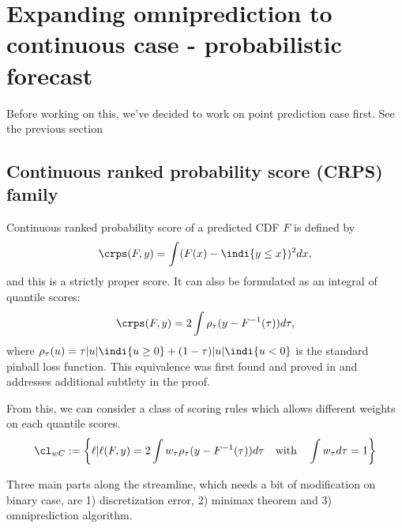 
\section{Expanding omniprediction to continuous case - probabilistic forecast}
{\color{blue} Before working on this, we've decided to work on point prediction case first. See the previous section}


\subsection{Continuous ranked probability score (CRPS) family}
Continuous ranked probability score of a predicted CDF $F$ is defined by
\begin{align}\label{eq:crps-x}
\crps(F, y) = \int (F(x) - \indi{y \leq x})^2 dx,
\end{align}
and this is a strictly proper score. It can also be formulated as an integral of quantile scores:
\begin{align}\label{eq:crps-tau}
\crps(F, y) = 2 \int \rho_\tau (y-F^{-1}(\tau)) d\tau,
\end{align}
where $\rho_\tau(u) = \tau |u|\indi{u \geq 0} +(1-\tau)|u|\indi{u < 0} $ is the standard pinball loss function. This equivalence was first found and proved in \cite{laio2007crps} and \cite{fakoor2023flexible} addresses additional subtlety in the proof.  

From this, we can consider a class of scoring rules which allows different weights on each quantile scores.
\[
\cl_{wC} := \left\{\ell {\Large\mid} \ell(F, y) = 2\int w_\tau \rho_\tau (y-F^{-1}(\tau))d\tau \quad\text{with}\quad \int w_\tau d\tau = 1\right\}
\]

Three main parts along the streamline, which needs a bit of modification on binary case, are 1) discretization error, 2) minimax theorem and 3) omniprediction algorithm.


